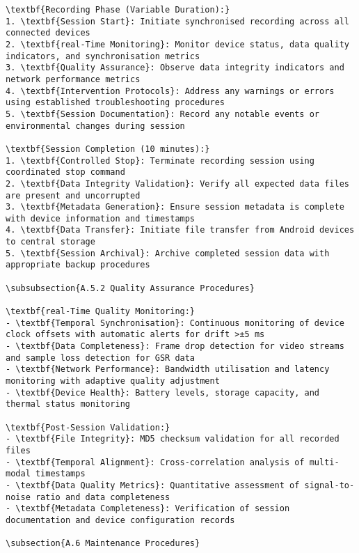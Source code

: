 \begin{verbatim}
\textbf{Recording Phase (Variable Duration):}
1. \textbf{Session Start}: Initiate synchronised recording across all connected devices
2. \textbf{real-Time Monitoring}: Monitor device status, data quality indicators, and synchronisation metrics
3. \textbf{Quality Assurance}: Observe data integrity indicators and network performance metrics
4. \textbf{Intervention Protocols}: Address any warnings or errors using established troubleshooting procedures
5. \textbf{Session Documentation}: Record any notable events or environmental changes during session

\textbf{Session Completion (10 minutes):}
1. \textbf{Controlled Stop}: Terminate recording session using coordinated stop command
2. \textbf{Data Integrity Validation}: Verify all expected data files are present and uncorrupted
3. \textbf{Metadata Generation}: Ensure session metadata is complete with device information and timestamps
4. \textbf{Data Transfer}: Initiate file transfer from Android devices to central storage
5. \textbf{Session Archival}: Archive completed session data with appropriate backup procedures

\subsubsection{A.5.2 Quality Assurance Procedures}

\textbf{real-Time Quality Monitoring:}
- \textbf{Temporal Synchronisation}: Continuous monitoring of device clock offsets with automatic alerts for drift >±5 ms
- \textbf{Data Completeness}: Frame drop detection for video streams and sample loss detection for GSR data
- \textbf{Network Performance}: Bandwidth utilisation and latency monitoring with adaptive quality adjustment
- \textbf{Device Health}: Battery levels, storage capacity, and thermal status monitoring

\textbf{Post-Session Validation:}
- \textbf{File Integrity}: MD5 checksum validation for all recorded files
- \textbf{Temporal Alignment}: Cross-correlation analysis of multi-modal timestamps
- \textbf{Data Quality Metrics}: Quantitative assessment of signal-to-noise ratio and data completeness
- \textbf{Metadata Completeness}: Verification of session documentation and device configuration records

\subsection{A.6 Maintenance Procedures}


\end{verbatim}
